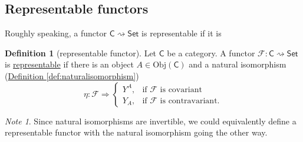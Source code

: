 \documentclass[a4paper]{report}
\newcommand{\defn}[1]{\ul{#1}}
\newcommand{\Obj}{\mathrm{Obj}}
\theoremstyle{definition}
\newtheorem{definition}{Definition}[section]
\theoremstyle{plain}
\theoremstyle{remark}
\newtheorem{note}{Note}[section]
\begin{document}
\subsection{Representable functors}
Roughly speaking, a functor $\mathsf{C} \rightsquigarrow \mathsf{Set}$ is representable if it is 

\begin{definition}[representable functor]
  \label{def:representablefunctor}
  Let $\mathsf{C}$ be a category. A functor $\mathcal{F}\colon \mathsf{C} \rightsquigarrow \mathsf{Set}$ is \defn{representable} if there is an object $A \in \Obj(\mathsf{C})$ and a natural isomorphism (\hyperref[def:naturalisomorphism]{Definition \ref*{def:naturalisomorphism}})
  \begin{equation*}
    \eta\colon \mathcal{F} \Rightarrow 
    \begin{cases}
      Y^{A}, & \text{if $\mathcal{F}$ is covariant} \\
      Y_{A}, & \text{if $\mathcal{F}$ is contravariant.}
    \end{cases}
  \end{equation*}
\end{definition}

\begin{note}
  Since natural isomorphisms are invertible, we could equivalently define a representable functor with the natural isomorphism going the other way.
\end{note}
\end{document}
